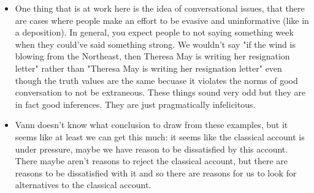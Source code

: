 \documentclass[12pt]{article}
\theoremstyle{definition}
\begin{document}
\begin{itemize}
(??).
\item One thing that is at work here is the idea of conversational issues, that
there are cases where people make an effort to be evasive and uninformative
(like in a deposition). In general, you expect people to not saying something
week when they could've said something strong. We wouldn't say "if the wind is
blowing from the Northeast, then Theresa May is writing her resignation letter"
rather than "Theresa May is writing her resignation letter" even though the
truth values are the same becuase it violates the norms of good conversation to
not be extraneous. These things sound very odd but they are in fact good
inferences. They are just pragmatically infelicitous.
\item Vann doesn't know what conclusion to draw from these examples, but it
seems like at least we can get this much: it seems like the classical account
is under pressure, maybe we have reason to be dissatisfied by this account.
There maybe aren't reasons to reject the classical account, but there are
reasons to be dissatisfied with it and so there are reasons for us to look for
alternatives to the classical account.
\end{itemize}
\end{document}
